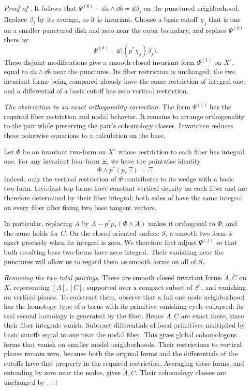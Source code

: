 \begin{proof}[Proof of ]
It follows that
$\Psi^{(0)}-\dd a\wedge\dd b=\dd\beta_j$ on the punctured
neighborhood.  Replace $\beta_j$ by its average, so it is invariant.
Choose a basic cutoff $\chi_j$ that is one on a smaller punctured
disk and zero near the outer boundary, and replace $\Psi^{(0)}$ there
by
\[
 \Psi^{(0)}-\dd\bigl((p^*\chi_j)\beta_j\bigr).
\]
These disjoint modifications give a smooth closed invariant form
$\Psi^{(1)}$ on $X^\circ$, equal to $\dd a\wedge\dd b$ near the
punctures.  Its fiber restriction is unchanged: the two invariant
forms being compared already have the same restriction of integral
one, and a differential of a basic cutoff has zero vertical
restriction.

\emph{The obstruction to an exact orthogonality correction.}
The form $\Psi^{(1)}$ has the required fiber restriction and nodal
behavior.  It remains to arrange orthogonality to the pair while
preserving the pair's cohomology classes.  Invariance reduces these
pointwise equations to a calculation on the base.

Let $\Phi$ be an invariant two-form on $X^\circ$ whose restriction
to each fiber has integral one.  For any invariant four-form $\Xi$,
we have the pointwise identity
\begin{equation}\label{eq:regular-invariant-top-form}
 \Phi\wedge p^*(p_*\Xi)=\Xi.
\end{equation}
Indeed, only the vertical restriction of $\Phi$ contributes to its
wedge with a basic two-form.  Invariant top forms have constant
vertical density on each fiber and are therefore determined by their
fiber integral; both sides of
 have the same integral on every
fiber after fixing two base tangent vectors.

In particular, replacing $A$ by
$A-p^*p_*(\Phi\wedge A)$ makes it orthogonal to $\Phi$, and the
same holds for $C$.  On the closed oriented surface $S$, a smooth
two-form is exact precisely when its integral is zero.  We therefore
first adjust $\Psi^{(1)}$ so that both resulting base two-forms have
zero integral.  Their vanishing near the punctures will allow us to
regard them as smooth forms on all of $S$.

\emph{Removing the two total pairings.}
There are smooth closed invariant forms $\widetilde A,\widetilde C$
on $X$, representing $[A],[C]$, supported over a compact subset of
$S^\circ$, and vanishing on vertical planes.  To construct them,
observe that a full one-node neighborhood has the homotopy type of a
torus with its primitive vanishing cycle collapsed; its real second
homology is generated by the fiber.  Hence $A,C$ are exact there,
since their fiber integrals vanish.  Subtract differentials of local
primitives multiplied by basic cutoffs equal to one near the nodal
fiber.  This gives global cohomologous forms that vanish on smaller
model neighborhoods.  Their restrictions to vertical planes remain
zero, because both the original forms and the differentials of the
cutoffs have that property in the required restriction.  Averaging
these forms, and extending by zero near the nodes, gives
$\widetilde A,\widetilde C$.  Their cohomology classes are unchanged
by .


\end{proof}
